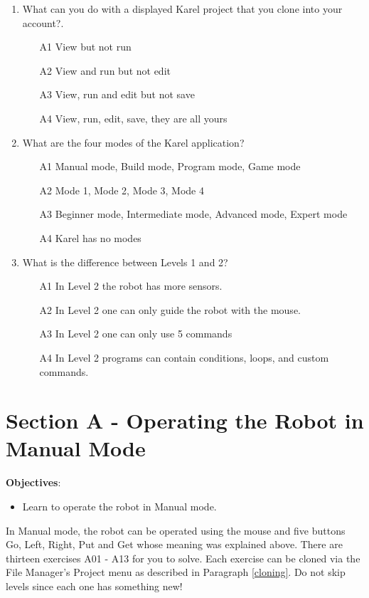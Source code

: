 \documentclass[article,A4,12pt]{llncs}
\begin{document}
\begin{enumerate}
\item What can you do with a displayed Karel project that you clone into your account?.
\begin{enumerate}
\item[A1] View but not run
\item[A2] View and run but not edit
\item[A3] View, run and edit but not save
\item[A4] View, run, edit, save, they are all yours
\end{enumerate}
\item What are the four modes of the Karel application?
\begin{enumerate}
\item[A1] Manual mode, Build mode, Program mode, Game mode
\item[A2] Mode 1, Mode 2, Mode 3, Mode 4
\item[A3] Beginner mode, Intermediate mode, Advanced mode, Expert mode
\item[A4] Karel has no modes
\end{enumerate}
\item What is the difference between Levels 1 and 2?
\begin{enumerate}
\item[A1] In Level 2 the robot has more sensors. 
\item[A2] In Level 2 one can only guide the robot with the mouse.
\item[A3] In Level 2 one can only use 5 commands
\item[A4] In Level 2 programs can contain 
      conditions, loops, and custom commands.
\end{enumerate}
\end{enumerate}


\section{Section A - Operating the Robot in Manual Mode}

\noindent
{\bf Objectives}: 
\begin{itemize}
\item Learn to operate the robot in Manual mode.\\
\end{itemize}

\noindent
In Manual mode, the robot can be operated using the mouse and five buttons Go, Left, Right, Put and Get 
whose meaning was explained above. There are thirteen exercises A01 - A13 for you to solve.
Each exercise can be cloned via the File Manager's 
Project menu as described in Paragraph \ref{cloning}. 
Do not skip levels since each one has something new! 
\end{document}
